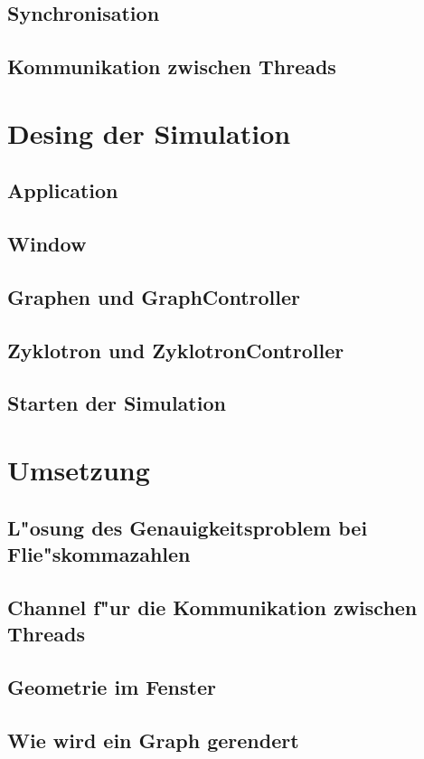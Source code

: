 \documentclass[14pt, a4paper]{report}
\begin{document}
\section{Synchronisation}
\section{Kommunikation zwischen Threads}

\chapter{Desing der Simulation}
\section{Application}
\section{Window} 
\section{Graphen und GraphController}
\section{Zyklotron und ZyklotronController}
\section{Starten der Simulation}

\chapter{Umsetzung}
\section{L"osung des Genauigkeitsproblem bei Flie"skommazahlen}
\section{Channel f"ur die Kommunikation zwischen Threads}
\section{Geometrie im Fenster}
\section{Wie wird ein Graph gerendert}
\end{document}
